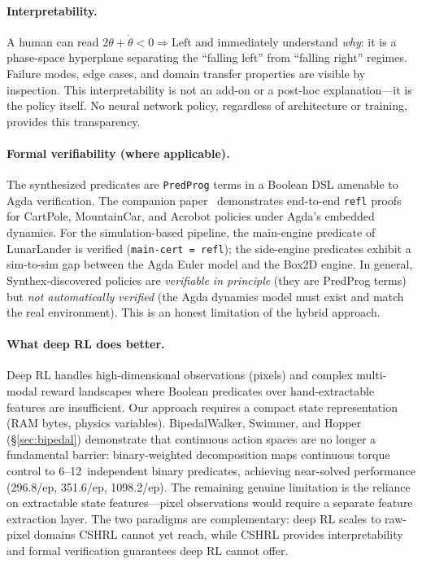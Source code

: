 \documentclass[9pt,a4paper]{article}
\theoremstyle{plain}
\theoremstyle{definition}
\theoremstyle{remark}
\begin{document}
\paragraph{Interpretability.}
A human can read $2\theta + \dot\theta < 0 \Rightarrow \text{Left}$
and immediately understand \emph{why}: it is a phase-space
hyperplane separating the ``falling left'' from ``falling right''
regimes.  Failure modes, edge cases, and domain transfer
properties are visible by inspection.  This interpretability
is not an add-on or a post-hoc explanation---it is the policy
itself.  No neural network policy, regardless of architecture
or training, provides this transparency.

\paragraph{Formal verifiability (where applicable).}
The synthesized predicates are \texttt{PredProg} terms in a
Boolean DSL amenable to Agda verification.  The companion
paper~\cite{CSHRLSynthesis2026} demonstrates end-to-end
\texttt{refl} proofs for CartPole, MountainCar, and Acrobot
policies under Agda's embedded dynamics.  For the
simulation-based pipeline, the main-engine predicate of
LunarLander is verified (\texttt{main-cert = refl}); the
side-engine predicates exhibit a sim-to-sim gap between the
Agda Euler model and the Box2D engine.  In general, Synthex-discovered policies are
\emph{verifiable in principle} (they are PredProg terms) but
\emph{not automatically verified} (the Agda dynamics model
must exist and match the real environment).  This is an honest
limitation of the hybrid approach.

\paragraph{What deep RL does better.}
Deep RL handles high-dimensional observations (pixels) and complex
multi-modal reward landscapes where Boolean predicates over
hand-extractable features are insufficient.
Our approach requires a compact state representation (RAM bytes,
physics variables).  BipedalWalker, Swimmer, and Hopper (\S\ref{sec:bipedal})
demonstrate that continuous action spaces are no longer a
fundamental barrier: binary-weighted decomposition maps continuous
torque control to 6--12~independent binary predicates, achieving
near-solved performance (296.8/ep, 351.6/ep, 1098.2/ep).  The remaining genuine
limitation is the reliance on extractable state features---pixel
observations would require a separate feature extraction layer.
The two paradigms are complementary: deep RL scales to raw-pixel
domains CSHRL cannot yet reach, while CSHRL provides interpretability
and formal verification guarantees deep RL cannot offer.
\end{document}
